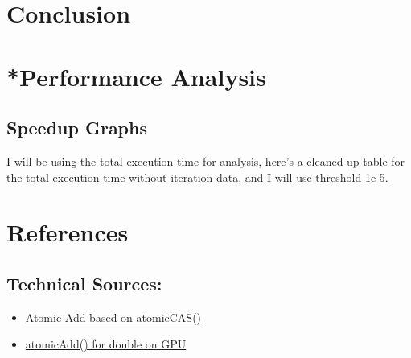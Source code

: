 \documentclass[letterpaper,12pt]{article}
\theoremstyle{remark}
\begin{document}
\section*{Conclusion}

\section{*Performance Analysis}

 
\subsection*{Speedup Graphs}
I will be using the total execution time for analysis, here's a cleaned up table for the total execution time without iteration data, and I will use threshold 1e-5.


\section*{References}


\subsection*{Technical Sources:}

\begin{itemize}

    \item \href{https://docs.nvidia.com/cuda/cuda-c-programming-guide/index.html#atomic-functions}{Atomic Add based on atomicCAS()}
    \item \href{https://stackoverflow.com/questions/16077464/atomicadd-for-double-on-gpu}{atomicAdd() for double on GPU}
     \end{itemize}
\end{document}
